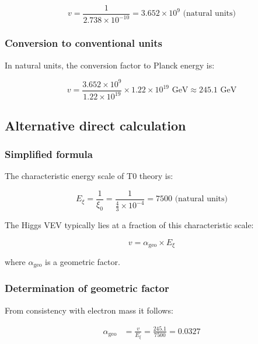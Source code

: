 \documentclass[12pt,a4paper]{article}
\begin{document}
\begin{equation}
	v = \frac{1}{2.738 \times 10^{-10}} = 3.652 \times 10^9 \text{ (natural units)}
\end{equation}

\subsubsection{Conversion to conventional units}

In natural units, the conversion factor to Planck energy is:

\begin{equation}
	v = \frac{3.652 \times 10^9}{1.22 \times 10^{19}} \times 1.22 \times 10^{19} \text{ GeV} \approx 245.1 \text{ GeV}
\end{equation}

\subsection{Alternative direct calculation}

\subsubsection{Simplified formula}

The characteristic energy scale of T0 theory is:

\begin{equation}
	E_\xi = \frac{1}{\xi_0} = \frac{1}{\frac{4}{3} \times 10^{-4}} = 7500 \text{ (natural units)}
\end{equation}

The Higgs VEV typically lies at a fraction of this characteristic scale:

\begin{equation}
	v = \alpha_{\text{geo}} \times E_\xi
\end{equation}

where $\alpha_{\text{geo}}$ is a geometric factor.

\subsubsection{Determination of geometric factor}

From consistency with electron mass it follows:

\begin{align}
	\alpha_{\text{geo}} &= \frac{v}{E_\xi} = \frac{245.1}{7500} = 0.0327
\end{align}
\end{document}
